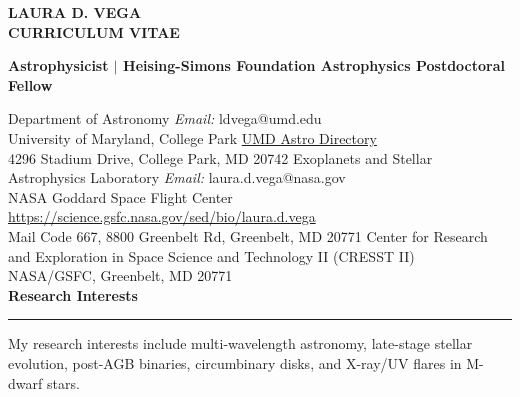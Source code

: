 \documentclass[letter,11pt]{article}
\begin{document}
\pagestyle{fancy}
\fancyhf{}
\renewcommand{\headrulewidth}{0pt}


\begin{center} 
\bfseries{
\LARGE \uppercase{Laura D. Vega} \\
\large \uppercase{Curriculum Vitae}}
\end{center}

\noindent
\begin{center}{\bf Astrophysicist \(|\) Heising-Simons Foundation Astrophysics Postdoctoral Fellow} \\
\end{center}

{ \small
\noindent Department of Astronomy \hfill \textit{Email:} ldvega@umd.edu \\
\noindent University of Maryland, College Park \hfill \href{https://www.astro.umd.edu/people/directory.html#Postdocs\%20and\%20Faculty\%20Assistants}{UMD Astro Directory}  \\
4296 Stadium Drive, College Park, MD 20742
\vskip 0.1in
\noindent Exoplanets and Stellar Astrophysics Laboratory \hfill \textit{Email:} laura.d.vega@nasa.gov
\\ 
NASA Goddard Space Flight Center \hfill
\url{https://science.gsfc.nasa.gov/sed/bio/laura.d.vega} \\
Mail Code 667, 8800 Greenbelt Rd, Greenbelt, MD 20771
\vskip 0.1in
\noindent Center for Research and Exploration in Space Science and Technology II (CRESST II) \\ NASA/GSFC, Greenbelt, MD 20771 \\

}
\noindent
{\bf Research Interests} \\
\vspace{-10mm}
\begin{center}
\rule{\textwidth}{0.2mm}
\end{center}
\vspace{-3mm}
\noindent
My research interests include multi-wavelength astronomy, late-stage stellar evolution, post-AGB binaries, circumbinary disks, and X-ray/UV flares in M-dwarf stars. \\
\end{document}
